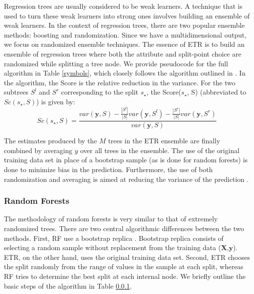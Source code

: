 \documentclass[a4paper,fleqn,usenatbib]{mnras}
\begin{document}
\par Regression trees are usually considered to be weak learners. A technique that is used to turn these weak learners into strong ones involves building an ensemble of weak learners. In the context of regression trees, there are two popular ensemble methods: boosting and randomization. Since we have a multidimensional output, we focus on randomized ensemble techniques. The essence of ETR is to build an ensemble of regression trees where both the attribute and split-point choice are randomized while splitting a tree node. We provide pseudocode for the full algorithm in Table \ref{symbols}, which closely follows the algorithm outlined in \citet{geurts2006extremely}. In the algorithm, the Score is the relative reduction in the variance. For the two subtrees $S^l$  and $S^r$ corresponding to the split $s_{\star}$, the Score($s_{\star}$, S) (abbreviated to $Sc(s_{\star}, S)$) is given by:
\begin{equation}
Sc(s_{\star}, S) = \frac{var(\textbf{y}, S) - \frac{|S^l|}{|S|} var(\textbf{y}, S^l) - \frac{|S^r|}{|S|} var(\textbf{y}, S^r)}{var(\textbf{y},S)}
\end{equation}

The estimates produced by the $M$ trees in the ETR ensemble are finally combined by averaging $y$ over all trees in the ensemble. The use of the original training data set in place of a bootstrap sample (as is done for random forests) is done to minimize bias in the prediction. Furthermore, the use of both randomization and averaging is aimed at reducing the variance of the prediction \citep{geurts2006extremely}. 

\subsubsection{Random Forests} \label{rf}

The methodology of random forests \citep[RF]{breiman2001random} is very similar to that of extremely randomized trees. There are two central algorithmic differences between the two methods. First, RF use a bootstrap replica \citep{breiman1996bagging}. Bootstrap replica consists of selecting a random sample without replacement from the training data ($\textbf{X,y}$). ETR, on the other hand, uses the original training data set. Second, ETR chooses the split randomly from the range of values in the sample at each split, whereas RF tries to determine the best split at each internal node. We briefly outline the basic steps of the algorithm in Table \ref{rf}. 
\end{document}
